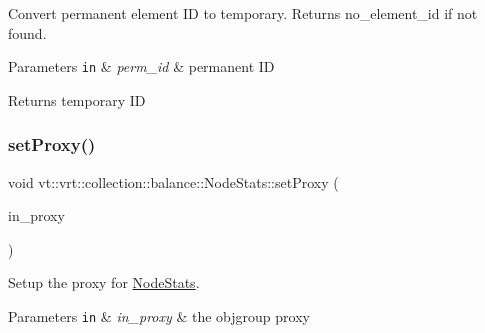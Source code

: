 Convert permanent element ID to temporary. Returns {\ttfamily no\+\_\+element\+\_\+id} if not found. 


\begin{DoxyParams}[1]{Parameters}
\mbox{\tt in}  & {\em perm\+\_\+id} & permanent ID\\
\hline
\end{DoxyParams}
\begin{DoxyReturn}{Returns}
temporary ID 
\end{DoxyReturn}
\mbox{\label{structvt_1_1vrt_1_1collection_1_1balance_1_1_node_stats_a30e9e5def6e7d6d31cd6597c5fea2345}} 
\subsubsection{\texorpdfstring{set\+Proxy()}{setProxy()}}
{\footnotesize\ttfamily void vt\+::vrt\+::collection\+::balance\+::\+Node\+Stats\+::set\+Proxy (\begin{DoxyParamCaption}\item[{\hyperlink{structvt_1_1objgroup_1_1proxy_1_1_proxy}{objgroup\+::proxy\+::\+Proxy}$<$ \hyperlink{structvt_1_1vrt_1_1collection_1_1balance_1_1_node_stats}{Node\+Stats} $>$}]{in\+\_\+proxy }\end{DoxyParamCaption})\hspace{0.3cm}{\ttfamily [private]}}



Setup the proxy for {\ttfamily \hyperlink{structvt_1_1vrt_1_1collection_1_1balance_1_1_node_stats}{Node\+Stats}}. 


\begin{DoxyParams}[1]{Parameters}
\mbox{\tt in}  & {\em in\+\_\+proxy} & the objgroup proxy \\
\hline
\end{DoxyParams}
\mbox{\label{structvt_1_1vrt_1_1collection_1_1balance_1_1_node_stats_ae76790d41701769b86ef15e4924d661d}} 
